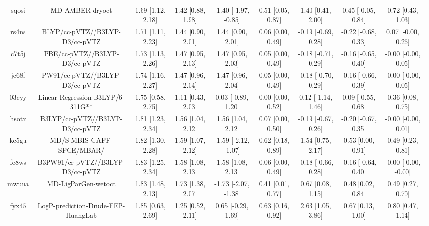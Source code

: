 \documentclass{article}
\begin{document}
\begin{center}
\begin{longtable}{|ccccccccc|}
 sqosi &                                    MD-AMBER-dryoct &  1.69 [1.12, 2.18] &  1.42 [0.88, 1.98] &  -1.40 [-1.97, -0.85] &  0.51 [0.05, 0.87] &    1.40 [0.41, 2.00] &   0.45 [-0.05, 0.84] &     0.72 [0.43, 1.03] \\
 rs4ns &                     BLYP/cc-pVTZ//B3LYP-D3/cc-pVTZ &  1.71 [1.11, 2.23] &  1.44 [0.90, 2.01] &     1.44 [0.90, 2.01] &  0.06 [0.00, 0.49] &  -0.19 [-0.69, 0.28] &  -0.22 [-0.68, 0.33] &    0.07 [-0.00, 0.26] \\
 c7t5j &                      PBE/cc-pVTZ//B3LYP-D3/cc-pVTZ &  1.73 [1.13, 2.26] &  1.47 [0.95, 2.03] &     1.47 [0.95, 2.03] &  0.05 [0.00, 0.49] &  -0.18 [-0.71, 0.29] &  -0.16 [-0.65, 0.40] &   -0.00 [-0.00, 0.05] \\
 jc68f &                     PW91/cc-pVTZ//B3LYP-D3/cc-pVTZ &  1.74 [1.16, 2.27] &  1.47 [0.96, 2.04] &     1.47 [0.96, 2.04] &  0.05 [0.00, 0.49] &  -0.18 [-0.70, 0.29] &  -0.16 [-0.66, 0.39] &   -0.00 [-0.00, 0.05] \\
 03cyy &                   Linear Regression-B3LYP/6-311G** &  1.75 [0.58, 2.75] &  1.11 [0.43, 2.03] &    0.03 [-0.89, 1.20] &  0.00 [0.00, 0.52] &   0.12 [-1.14, 1.46] &   0.09 [-0.55, 0.68] &     0.36 [0.08, 0.75] \\
 hsotx &                    B3LYP/cc-pVTZ//B3LYP-D3/cc-pVTZ &  1.81 [1.23, 2.34] &  1.56 [1.04, 2.12] &     1.56 [1.04, 2.12] &  0.07 [0.00, 0.50] &  -0.19 [-0.67, 0.26] &  -0.20 [-0.67, 0.35] &   -0.00 [-0.00, 0.01] \\
 ke5gu &                          MD/S-MBIS-GAFF-SPCE/MBAR/ &  1.82 [1.30, 2.28] &  1.59 [1.07, 2.12] &  -1.59 [-2.12, -1.07] &  0.62 [0.18, 0.89] &    1.54 [0.75, 2.17] &    0.53 [0.00, 0.91] &     0.49 [0.23, 0.81] \\
 fe8ws &                   B3PW91/cc-pVTZ//B3LYP-D3/cc-pVTZ &  1.83 [1.25, 2.34] &  1.58 [1.08, 2.13] &     1.58 [1.08, 2.13] &  0.06 [0.00, 0.49] &  -0.18 [-0.66, 0.28] &  -0.16 [-0.64, 0.40] &  -0.00 [-0.00, -0.00] \\
 mwuua &                                MD-LigParGen-wetoct &  1.83 [1.48, 2.13] &  1.73 [1.38, 2.07] &  -1.73 [-2.07, -1.38] &  0.41 [0.01, 0.77] &    0.67 [0.08, 1.15] &    0.48 [0.02, 0.84] &     0.49 [0.27, 0.70] \\
 fyx45 &                 LogP-prediction-Drude-FEP-HuangLab &  1.85 [0.63, 2.69] &  1.25 [0.52, 2.11] &    0.65 [-0.29, 1.69] &  0.63 [0.16, 0.92] &    2.63 [1.05, 3.86] &    0.67 [0.13, 1.00] &     0.80 [0.47, 1.14] \\

\end{longtable}
\end{center}
\end{document}
